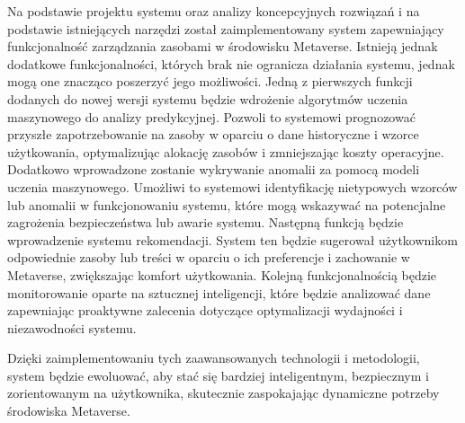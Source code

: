 Na podstawie projektu systemu oraz analizy koncepcyjnych rozwiązań i na podstawie istniejących narzędzi został zaimplementowany system zapewniający funkcjonalność zarządzania zasobami w środowisku Metaverse. Istnieją jednak dodatkowe funkcjonalności, których brak nie ogranicza działania systemu, jednak mogą one znacząco poszerzyć jego możliwości. Jedną z pierwszych funkcji dodanych do nowej wersji systemu będzie wdrożenie algorytmów uczenia maszynowego do analizy predykcyjnej. Pozwoli to systemowi prognozować przyszłe zapotrzebowanie na zasoby w oparciu o dane historyczne i wzorce użytkowania, optymalizując alokację zasobów i zmniejszając koszty operacyjne. Dodatkowo wprowadzone zostanie wykrywanie anomalii za pomocą modeli uczenia maszynowego. Umożliwi to systemowi identyfikację nietypowych wzorców lub anomalii w funkcjonowaniu systemu, które mogą wskazywać na potencjalne zagrożenia bezpieczeństwa lub awarie systemu. Następną funkcją będzie wprowadzenie systemu rekomendacji. System ten będzie sugerował użytkownikom odpowiednie zasoby lub treści w oparciu o ich preferencje i zachowanie w Metaverse, zwiększając komfort użytkowania. Kolejną funkcjonalnością będzie monitorowanie oparte na sztucznej inteligencji, które będzie analizować dane zapewniając proaktywne zalecenia dotyczące optymalizacji wydajności i niezawodności systemu.

Dzięki zaimplementowaniu tych zaawansowanych technologii i metodologii, system będzie ewoluować, aby stać się bardziej inteligentnym, bezpiecznym i zorientowanym na użytkownika, skutecznie zaspokajając dynamiczne potrzeby środowiska Metaverse.